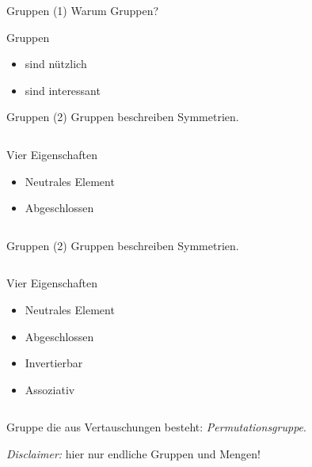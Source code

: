 \begin{frame}{Gruppen (1)}
Warum Gruppen?

\pause
Gruppen
\begin{itemize}
\item sind nützlich
\pause
\item sind interessant
\end{itemize}
\end{frame}


\begin{frame}{Gruppen (2)}
Gruppen beschreiben Symmetrien.
\\[-2em]
\begin{columns}
\begin{column}{0.4\textwidth}
Vier Eigenschaften
\begin{itemize}
\pause
\item Neutrales Element
\pause
\item Abgeschlossen
\vspace{3.2em}
\end{itemize}
\end{column}
\begin{column}{0.5\textwidth}
\begin{center}
\end{center}
\end{column}
\end{columns}
\vspace{1.4em}
\end{frame}

\begin{frame}[noframenumbering]{Gruppen (2)}
Gruppen beschreiben Symmetrien.
\\[-2em]
\begin{columns}
\begin{column}{0.4\textwidth}
Vier Eigenschaften
\begin{itemize}
\item Neutrales Element
\item Abgeschlossen
\pause
\item Invertierbar
\pause
\item Assoziativ
\end{itemize}
\end{column}
\begin{column}{0.5\textwidth}
\begin{center}
\end{center}
\end{column}
\end{columns}
\vspace{-2em}
Gruppe die aus Vertauschungen besteht:
\emph{Permutationsgruppe}.

\pause
\emph{Disclaimer:} hier nur endliche Gruppen und Mengen!
\end{frame}

